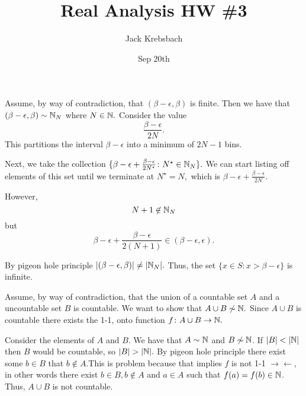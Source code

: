 \documentclass{report}
\title{Real Analysis HW \#3}
\author{Jack Krebsbach }
\date{Sep 20th}
\begin{document}
\maketitle


\sol
\begin{myproof}
    
Assume, by way of contradiction, that $(\beta - \epsilon, \beta)$ is finite. Then we have that $(\beta - \epsilon,\beta) \sim \NN_{N}$ where $N \in \NN.$ Consider the value $$\frac{\beta - \epsilon}{2N}.$$ This partitions the interval $\beta - \epsilon$ into a minimum of $2N-1$ bins. 

Next, we take the collection $\{ \beta - \epsilon + \frac{\beta - \epsilon}{2N^\star}  \colon  N^\star \in \NN_N\}.$ We can start listing off elements of this set until we terminate at $N^\star = N,$ which is $ \beta - \epsilon + \frac{\beta-\epsilon}{2N}$.\par However, $$N + 1 \not\in \NN_N$$ but 
$$ \beta - \epsilon + \frac{\beta - \epsilon}{2(N+1)} \in (\beta - \epsilon, \epsilon).$$

By pigeon hole principle $|(\beta-\epsilon, \beta)| \neq |\NN_N|.$ Thus, the set $\{x \in S: x>\beta-\epsilon\}$ is infinite.

\end{myproof}
\begin{myproof}
  Assume, by way of contradiction, that the union of a countable set $A$ and a uncountable set $B$ is countable. We want to show that $A \cup B \not\sim \NN.$ Since $A \cup B$ is countable there exists the 1-1, onto function $f\colon  A \cup B \rightarrow \NN.$

Consider the elements of $A$ and $B$. We have that $A \sim \NN$ and $B \not\sim \NN$. If $|B| < |\NN|$ then $B$ would be countable, so $|B| > |\NN|.$ By pigeon hole principle there exist some $b \in B$ that $b \not \in A.$This is problem because that implies $f$ is not 1-1 $\rightarrow\!\leftarrow$, in other words there exist $b \in B, b\not\in A$ and $a \in A$ such that $f(a)=f(b) \in \NN$. Thus, $A \cup B$ is not countable.
  
\end{myproof}
\end{document}

